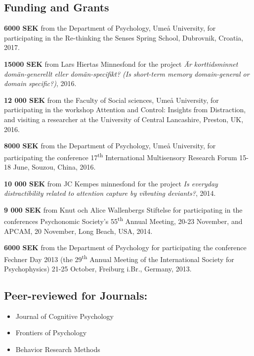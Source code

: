 \documentclass[]{article}
\providecommand{\tightlist}{%
  \setlength{\itemsep}{0pt}\setlength{\parskip}{0pt}}
\begin{document}
\hypertarget{funding-and-grants}{%
\subsection{Funding and Grants}\label{funding-and-grants}}

\textbf{6000 SEK} from the Department of Psychology, Umeå University,
for participating in the Re-thinking the Senses Spring School,
Dubrovnik, Croatia, 2017.

\textbf{15000 SEK} from Lars Hiertas Minnesfond for the project \emph{Är
korttidsminnet domän-generellt eller domän-specifikt? (Is short-term
memory domain-general or domain specific?)}, 2016.

\textbf{12 000 SEK} from the Faculty of Social sciences, Umeå
University, for participating in the workshop Attention and Control:
Insights from Distraction, and visiting a researcher at the University
of Central Lancashire, Preston, UK, 2016.

\textbf{8000 SEK} from the Department of Psychology, Umeå University,
for participating the conference 17\textsuperscript{th} International
Multisensory Research Forum 15-18 June, Souzou, China, 2016.

\textbf{10 000 SEK} from JC Kempes minnesfond for the project \emph{Is
everyday distractibility related to attention capture by vibrating
deviants?}, 2014.

\textbf{9 000 SEK} from Knut och Alice Wallenbergs Stiftelse for
participating in the conferences Psychonomic Society's
55\textsuperscript{th} Annual Meeting, 20-23 November, and APCAM, 20
November, Long Beach, USA, 2014.

\textbf{6000 SEK} from the Department of Psychology for participating
the conference Fechner Day 2013 (the 29\textsuperscript{th} Annual
Meeting of the International Society for Psychophysics) 21-25 October,
Freiburg i.Br., Germany, 2013.

\hypertarget{peer-reviewed-for-journals}{%
\subsection{Peer-reviewed for
Journals:}\label{peer-reviewed-for-journals}}

\begin{itemize}
\tightlist
\item
  Journal of Cognitive Psychology
\item
  Frontiers of Psychology
\item
  Behavior Research Methods
\end{itemize}
\end{document}
